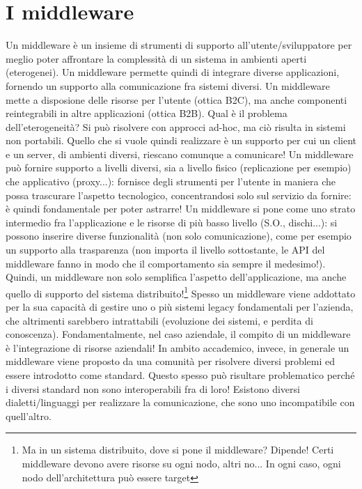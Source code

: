 \section{I middleware}
Un middleware è un insieme di strumenti di supporto all'utente/sviluppatore per meglio poter affrontare la complessità
di un sistema in ambienti aperti (eterogenei). Un middleware permette quindi di integrare diverse applicazioni,
fornendo un supporto alla comunicazione fra sistemi diversi.
Un middleware mette a disposione delle risorse per l'utente (ottica B2C), ma anche componenti reintegrabili in altre
applicazioni (ottica B2B).
Qual è il problema dell'eterogeneità? Si può risolvere con approcci ad-hoc, ma ciò risulta in sistemi non portabili.
Quello che si vuole quindi realizzare è un supporto per cui un client e un server, di ambienti diversi, riescano
comunque a comunicare!
Un middleware può fornire supporto a livelli diversi, sia a livello fisico (replicazione per esempio) che applicativo
(proxy...): fornisce degli strumenti per l'utente in maniera che possa trascurare l'aspetto tecnologico,
concentrandosi solo sul servizio da fornire: è quindi fondamentale per poter astrarre!
Un middleware si pone come uno strato intermedio fra l'applicazione e le risorse di più basso livello
(S.O., dischi...): si possono inserire diverse funzionalità (non solo comunicazione), come per esempio un supporto
alla trasparenza (non importa il livello sottostante, le API del middleware fanno in modo che il comportamento sia
sempre il medesimo!). Quindi, un middleware non solo semplifica l'aspetto dell'applicazione, ma anche quello di supporto
del sistema distribuito!\footnote{Ma in un sistema distribuito, dove si pone il middleware? Dipende! Certi middleware
devono avere risorse su ogni nodo, altri no... In ogni caso, ogni nodo dell'architettura può essere target}
Spesso un middleware viene addottato per la sua capacità di gestire uno o più sistemi legacy fondamentali per
l'azienda, che altrimenti sarebbero intrattabili (evoluzione dei sistemi, e perdita di conoscenza). Fondamentalmente,
nel caso aziendale, il compito di un middleware è l'integrazione di risorse aziendali!
In ambito accademico, invece, in generale un middleware viene proposto da una comunità per risolvere diversi problemi
ed essere introdotto come standard.
Questo spesso può risultare problematico perché i diversi standard non sono interoperabili fra di loro! Esistono
diversi dialetti/linguaggi per realizzare la comunicazione, che sono uno incompatibile con quell'altro.

